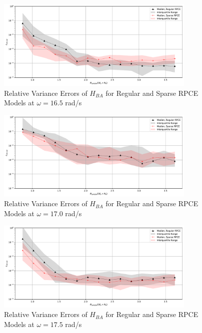 \begin{figure}[H]
    \centering
    \includegraphics[width=0.85\textwidth]{
        plots/surrogate/plot_3_B_17.pdf
    }
    \caption{%
        Relative Variance Errors of $H_{BA}$ for Regular and Sparse RPCE Models at $\omega=16.5$ rad/s
    }
    \label{var_sRPCE_B_A_17}
\end{figure}
\begin{figure}[H]
    \centering
    \includegraphics[width=0.85\textwidth]{
        plots/surrogate/plot_3_B_18.pdf
    }
    \caption{%
        Relative Variance Errors of $H_{BA}$ for Regular and Sparse RPCE Models at $\omega=17.0$ rad/s
    }
\end{figure}
\begin{figure}[H]
    \centering
    \includegraphics[width=0.85\textwidth]{
        plots/surrogate/plot_3_B_19.pdf
    }
    \caption{%
        Relative Variance Errors of $H_{BA}$ for Regular and Sparse RPCE Models at $\omega=17.5$ rad/s
    }
    \label{var_sRPCE_B_A_19}
\end{figure}
